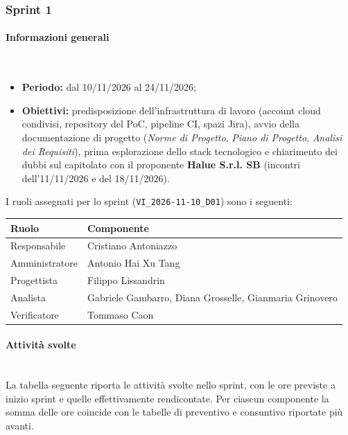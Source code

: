 \subsubsection{Sprint 1}

\paragraph{Informazioni generali}~\\[0.15cm]
\begin{itemize}
    \item \textbf{Periodo:} dal 10/11/2026 al 24/11/2026;
    \item \textbf{Obiettivi:} predisposizione dell'infrastruttura di lavoro (account cloud condivisi, repository del PoC, pipeline CI, spazi Jira), avvio della documentazione di progetto (\textit{Norme di Progetto}, \textit{Piano di Progetto}, \textit{Analisi dei Requisiti}), prima esplorazione dello stack tecnologico e chiarimento dei dubbi sul capitolato con il proponente \textbf{Halue S.r.l. SB} (incontri dell'11/11/2026 e del 18/11/2026).
\end{itemize}

\noindent
I ruoli assegnati per lo sprint (\texttt{VI\_2026-11-10\_D01}) sono i seguenti:

\vspace{2mm}
\renewcommand{\arraystretch}{1.3}
\noindent
\begin{tabularx}{\textwidth}{|l X|}
\hline
\textbf{Ruolo} & \textbf{Componente} \\
\hline
Responsabile & Cristiano Antoniazzo \\
Amministratore & Antonio Hai Xu Tang \\
Progettista & Filippo Lissandrin \\
Analista & Gabriele Gambarro, Diana Grosselle, Gianmaria Grinovero \\
Verificatore & Tommaso Caon \\
\hline
\end{tabularx}

\paragraph{Attività svolte}~\\[0.15cm]
La tabella seguente riporta le attività svolte nello sprint, con le ore previste a inizio sprint e quelle effettivamente rendicontate. Per ciascun componente la somma delle ore coincide con le tabelle di preventivo e consuntivo riportate più avanti.

